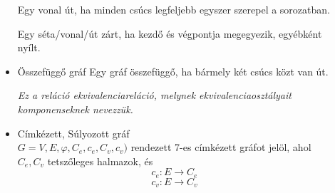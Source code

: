 \documentclass[margin=0px]{article}
\begin{document}
\begin{description}
\begin{itemize}
                  Egy vonal út, ha minden csúcs legfeljebb egyszer szerepel a sorozatban.

                  Egy séta/vonal/út zárt, ha kezdő és végpontja megegyezik, egyébként nyílt.
            \item Összefüggő gráf
                  Egy gráf összefüggő, ha bármely két csúcs közt van út.

                  \textit{Ez a reláció ekvivalenciareláció, melynek ekvivalenciaosztályait komponenseknek nevezzük.}
            \item Címkézett, Súlyozott gráf \\
                  $G=V,E,\varphi, C_e, c_e, C_v,c_v)$ rendezett 7-es címkézett gráfot jelöl, ahol $C_e, C_v$ tetszőleges halmazok, és
                  \[c_e:E\rightarrow C_e\]
                  \[c_v:E\rightarrow C_v\]


\end{itemize}
\end{description}
\end{document}
